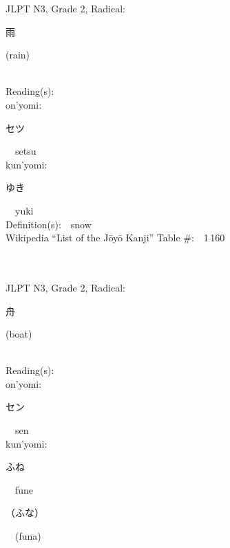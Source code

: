 \begin{multicols}{2}
{JLPT N3, Grade 2, Radical:\ \ {\begin{CJK}{UTF8}{min} 雨 \end{CJK}} (rain) } \\
Reading(s):\ \ \\
{\hspace*{1em}}on'yomi:\ \ \\
{\hspace*{2em}}{\begin{CJK}{UTF8}{min} セツ \end{CJK}}\ \ setsu\ \ \\
{\hspace*{1em}}kun'yomi:\ \ \\
{\hspace*{2em}}{\begin{CJK}{UTF8}{min} ゆき \end{CJK}}\ \ yuki\ \ \\
Definition(s):\ \ snow \\
Wikipedia ``List of the J\=oy\=o Kanji'' Table \#:\ \ 1\,160 \\
\ \ \\
{\fontsize{34pt}{40pt}  }\ \ \\  %
{JLPT N3, Grade 2, Radical:\ \ {\begin{CJK}{UTF8}{min} 舟 \end{CJK}} (boat) } \\
Reading(s):\ \ \\
{\hspace*{1em}}on'yomi:\ \ \\
{\hspace*{2em}}{\begin{CJK}{UTF8}{min} セン \end{CJK}}\ \ sen\ \ \\
{\hspace*{1em}}kun'yomi:\ \ \\
{\hspace*{2em}}{\begin{CJK}{UTF8}{min} ふね \end{CJK}}\ \ fune\ \ \\
{\hspace*{2em}}{\begin{CJK}{UTF8}{min} （ふな） \end{CJK}}\ \ (funa)\ \ \\

\end{multicols}
